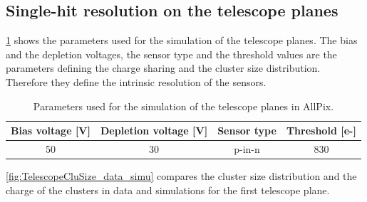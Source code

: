 \subsection{Single-hit resolution on the telescope planes}

\cref{tab:AllPixTelescopePlanesParams} shows the parameters used for
the simulation of the telescope planes. The bias and the depletion
voltages, the sensor type and the threshold values are the parameters
defining the charge sharing and the cluster size
distribution. Therefore they define the intrinsic resolution of the
sensors.

\begin{table}[htbp]
  \centering
  \caption{Parameters used for the simulation of the telescope planes in AllPix.}
  \label{tab:AllPixTelescopePlanesParams}
  \begin{tabular}{cccc}
    \toprule
    Bias voltage [V] & Depletion voltage [V] & Sensor type & Threshold [e-] \\
    \midrule
    50 & 30 & p-in-n & 830 \\
    \bottomrule
  \end{tabular}
\end{table}


\cref{fig:TelescopeCluSize_data_simu} compares the cluster size
distribution and the charge of the clusters in data and simulations
for the first telescope plane.

